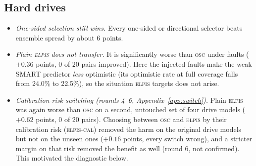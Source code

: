 \documentclass{esannV2}
\newcommand{\OSC}{\textsc{osc}}
\newcommand{\RPT}{\textsc{elpis}}
\newcommand{\AUTO}{\textsc{elpis-cal}}
\begin{document}
\subsection{Hard drives}
\begin{itemize}
\item \emph{One-sided selection still wins.} Every one-sided or directional selector beats ensemble spread by about 6 points.
\item \emph{Plain \RPT{} does not transfer.} It is significantly worse than \OSC{} under faults ($+0.36$ points, 0 of 20 pairs improved). Here the injected faults make the weak SMART predictor \emph{less} optimistic (its optimistic rate at full coverage falls from 24.0\% to 22.5\%), so the situation \RPT{} targets does not arise.
\item \emph{Calibration-risk switching (rounds 4--6, Appendix~\ref{app:switch}).} Plain \RPT{} was again worse than \OSC{} on a second, untouched set of four drive models ($+0.62$ points, 0 of 20 pairs). Choosing between \OSC{} and \RPT{} by their calibration risk (\AUTO) removed the harm on the original drive models but not on the unseen ones ($+0.16$ points, every switch wrong), and a stricter margin on that risk removed the benefit as well (round 6, not confirmed). This motivated the diagnostic below.

\end{itemize}
\end{document}
